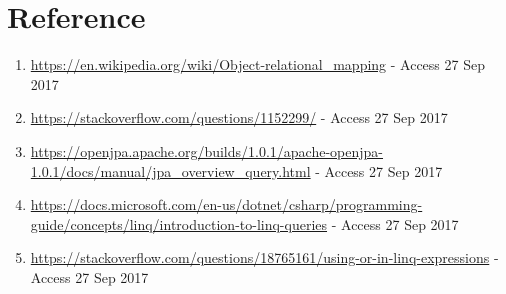 \documentclass[10pt]{report}
\begin{document}

\section{Reference}
\begin{enumerate}

\item \url{https://en.wikipedia.org/wiki/Object-relational_mapping} - Access 27 Sep 2017
\item \url{https://stackoverflow.com/questions/1152299/} - Access 27 Sep 2017
\item \url{https://openjpa.apache.org/builds/1.0.1/apache-openjpa-1.0.1/docs/manual/jpa_overview_query.html} - Access 27 Sep 2017
\item \url{https://docs.microsoft.com/en-us/dotnet/csharp/programming-guide/concepts/linq/introduction-to-linq-queries} - Access 27 Sep 2017
\item \url{https://stackoverflow.com/questions/18765161/using-or-in-linq-expressions} - Access 27 Sep 2017
\end{enumerate}
\end{document}
